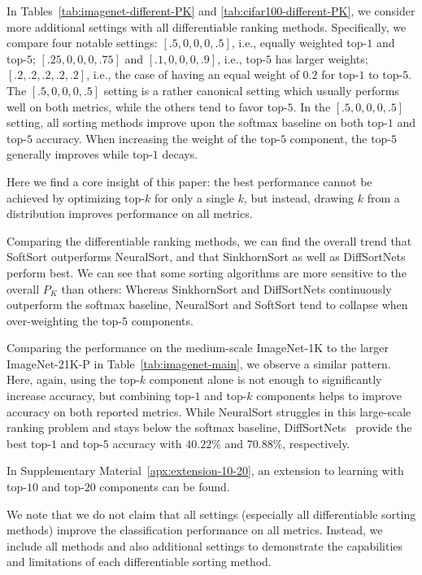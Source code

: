 \documentclass{article}
\begin{document}
In Tables~\ref{tab:imagenet-different-PK} and \ref{tab:cifar100-different-PK}, we consider more additional settings with all differentiable ranking methods.
Specifically, we compare four notable settings:
$[.5,0,0,0,.5]$, i.e., equally weighted top-$1$ and top-$5$; $[.25,0,0,0,.75]$ and $[.1,0,0,0,.9]$, i.e., top-$5$ has larger weights; $[.2, .2, .2, .2, .2]$, i.e., the case of having an equal weight of $0.2$ for top-$1$ to top-$5$.
The $[.5,0,0,0,.5]$ setting is a rather canonical setting which usually performs well on both metrics, while the others tend to favor top-$5$.
In the $[.5,0,0,0,.5]$ setting, all sorting methods improve upon the softmax baseline on both top-$1$ and top-$5$ accuracy.
When increasing the weight of the top-$5$ component, the top-$5$ generally improves while top-$1$ decays.

Here we find a core insight of this paper: the best performance cannot be achieved by optimizing top-$k$ for only a single $k$, but instead, drawing $k$ from a distribution improves performance on all metrics.

Comparing the differentiable ranking methods, we can find the overall trend that SoftSort outperforms NeuralSort, and that SinkhornSort as well as DiffSortNets perform best.
We can see that some sorting algorithms are more sensitive to the overall $P_K$ than others:
Whereas SinkhornSort \citep{Cuturi2019-SortingOT} and DiffSortNets \citep{Petersen2021-diffsort} continuously outperform the softmax baseline, NeuralSort \citep{Grover2019-NeuralSort} and SoftSort \citep{prillo2020softsort} tend to collapse when over-weighting the top-$5$ components.




Comparing the performance on the medium-scale ImageNet-1K to the larger ImageNet-21K-P in Table~\ref{tab:imagenet-main}, we observe a similar pattern. 
Here, again, using the top-$k$ component alone is not enough to significantly increase accuracy, but combining top-$1$ and top-$k$ components helps to improve accuracy on both reported metrics. 
While NeuralSort struggles in this large-scale ranking problem and stays below the softmax baseline, DiffSortNets~\citep{Petersen2021-diffsort} provide the best top-$1$ and top-$5$ accuracy with $40.22\%$ and $70.88\%$, respectively.

In Supplementary Material~\ref{apx:extension-10-20}, an extension to learning with top-$10$ and top-$20$ components can be found. 

We note that we do not claim that all settings (especially all differentiable sorting methods) improve the classification performance on all metrics. 
Instead, we include all methods and also additional settings to demonstrate the capabilities and limitations of each differentiable sorting method.
\end{document}
